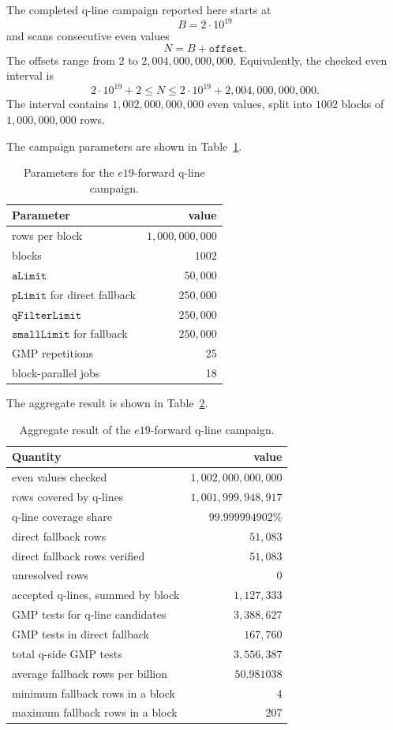 \documentclass[11pt]{article}
\begin{document}
The completed q-line campaign reported here starts at
\[
  B=2\cdot10^{19}
\]
and scans consecutive even values
\[
  N=B+\texttt{offset}.
\]
The offsets range from \(2\) to \(2{,}004{,}000{,}000{,}000\). Equivalently,
the checked even interval is
\[
  2\cdot10^{19}+2
  \le N \le
  2\cdot10^{19}+2{,}004{,}000{,}000{,}000.
\]
The interval contains \(1{,}002{,}000{,}000{,}000\) even values, split into
\(1002\) blocks of \(1{,}000{,}000{,}000\) rows.

The campaign parameters are shown in Table~\ref{tab:qlineparams}.

\begin{table}[!htbp]
\centering
\caption{Parameters for the \(e19\)-forward q-line campaign.}
\label{tab:qlineparams}
\begin{tabular}{lr}
\toprule
Parameter & value \\
\midrule
rows per block & \(1{,}000{,}000{,}000\) \\
blocks & \(1002\) \\
\(\texttt{aLimit}\) & \(50{,}000\) \\
\(\texttt{pLimit}\) for direct fallback & \(250{,}000\) \\
\(\texttt{qFilterLimit}\) & \(250{,}000\) \\
\(\texttt{smallLimit}\) for fallback & \(250{,}000\) \\
GMP repetitions & 25 \\
block-parallel jobs & 18 \\
\bottomrule
\end{tabular}
\end{table}

The aggregate result is shown in Table~\ref{tab:qlinecampaign}.

\begin{table}[!htbp]
\centering
\caption{Aggregate result of the \(e19\)-forward q-line campaign.}
\label{tab:qlinecampaign}
\begin{tabular}{lr}
\toprule
Quantity & value \\
\midrule
even values checked & \(1{,}002{,}000{,}000{,}000\) \\
rows covered by q-lines & \(1{,}001{,}999{,}948{,}917\) \\
q-line coverage share & \(99.999994902\%\) \\
direct fallback rows & \(51{,}083\) \\
direct fallback rows verified & \(51{,}083\) \\
unresolved rows & 0 \\
accepted q-lines, summed by block & \(1{,}127{,}333\) \\
GMP tests for q-line candidates & \(3{,}388{,}627\) \\
GMP tests in direct fallback & \(167{,}760\) \\
total q-side GMP tests & \(3{,}556{,}387\) \\
average fallback rows per billion & \(50.981038\) \\
minimum fallback rows in a block & 4 \\
maximum fallback rows in a block & 207 \\
\bottomrule
\end{tabular}
\end{table}
\end{document}
